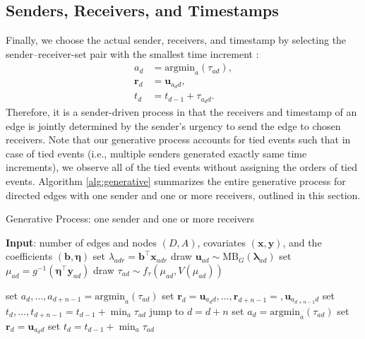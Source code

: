 \documentclass[ba]{imsart}
\def\spacingset#1{\renewcommand{\baselinestretch}%
	{#1}\small\normalsize} \spacingset{1}
\numberwithin{equation}{section}
\theoremstyle{plain}
\begin{document}
\subsection{Senders, Receivers, and Timestamps}\label{subsec:Observed}
Finally, we choose the actual sender, receivers, and timestamp by selecting the sender--receiver-set pair with the smallest time increment \citep{snijders1996stochastic}:
\begin{equation}
\begin{aligned}
a_d &= \mbox{argmin}_{a}(\tau_{ad}),\\
\boldsymbol{r}_d &= \boldsymbol{u}_{a_d d},\\
t_d &=t_{d-1} + \tau_{a_d d}.
\end{aligned}
\end{equation}
Therefore, it is a sender-driven process in that the receivers and timestamp of an edge is jointly determined by the sender's urgency to send the edge to chosen receivers. Note that our generative process accounts for tied events such that in case of tied events (i.e., multiple senders generated exactly same time increments), we observe all of the tied events without assigning the orders of tied events. Algorithm \ref{alg:generative} summarizes the entire generative process for directed edges with one sender and one or more receivers, outlined in this section.
	\begin{algorithm}[!t]
		\spacingset{1}
			\SetAlgoLined
		\caption{Generative Process: one sender and one or more receivers}
		\begin{algorithmic}
				\STATE \textbf{Input}: number of edges and nodes $(D, A)$, covariates $(\boldsymbol{x}, \boldsymbol{y})$, and the coefficients $(\boldsymbol{b}, \boldsymbol{\eta})$
				\vskip 0.1in
			\STATE	set $\lambda_{adr} = {\boldsymbol{b}}^{\top}\boldsymbol{x}_{adr}$
			\ENDFOR
			\STATE	draw $\boldsymbol{u}_{ad}  \sim
			\mbox{MB}_G(\boldsymbol{\lambda}_{ad})$
			\STATE		set $\mu_{ad} = g^{-1}(\boldsymbol{\eta}^\top \boldsymbol{y}_{ad})$
			\STATE		draw $\tau_{ad} \sim f_\tau(\mu_{ad}, V(\mu_{ad}))$
			\ENDFOR
		
			\STATE	set $a_d, \ldots, a_{d+n-1}= \mbox{argmin}_{a}(\tau_{ad})$
			\STATE	set $\boldsymbol{r}_d=\boldsymbol{u}_{a_d d},\ldots,\boldsymbol{r}_{d+n-1}= ,\boldsymbol{u}_{a_{d+n-1} d}$
			\STATE	set $t_d, \ldots, t_{d+n-1}=t_{d-1} + \min_a\tau_{ad}$
			\STATE		jump to $d = d+n$
				\ELSE
				\STATE	set $a_d= \mbox{argmin}_{a}(\tau_{ad})$
				\STATE		set $\boldsymbol{r}_d = \boldsymbol{u}_{a_d d}$
				\STATE	set $t_d =t_{d-1} + \min_a\tau_{ad}$
				\ENDIF
			\ENDFOR
		\end{algorithmic}
		\label{alg:generative}
	\end{algorithm}
\end{document}
